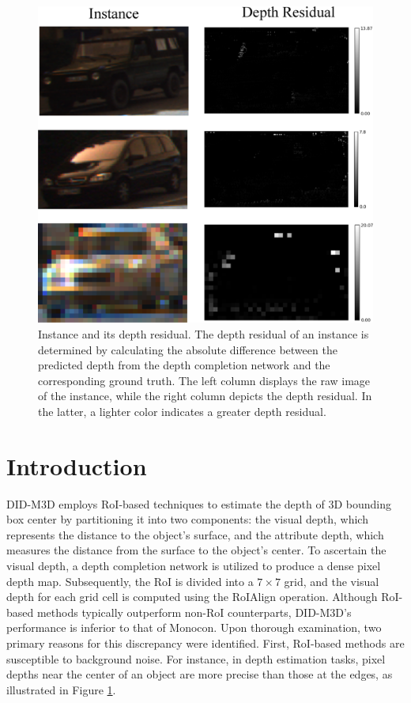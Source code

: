\documentclass{article}
\begin{document}
\begin{figure}[!t]
	\centering
	\includegraphics[width=1.0\linewidth]{Figures/depth_residual}
	\caption{Instance and its depth residual. The depth residual of an instance is determined by calculating the absolute difference between the predicted depth from the depth completion network and the corresponding ground truth. The left column displays the raw image of the instance, while the right column depicts the depth residual. In the latter, a lighter color indicates a greater depth residual.}
	\label{fig:depth_residual}
\end{figure}

\section{Introduction}
DID-M3D employs RoI-based techniques to estimate the depth of 3D bounding box center by partitioning it into two components: the visual depth, which represents the distance to the object's surface, and the attribute depth, which measures the distance from the surface to the object's center. To ascertain the visual depth, a depth completion network is utilized to produce a dense pixel depth map. Subsequently, the RoI is divided into a $7\times 7$ grid, and the visual depth for each grid cell is computed using the RoIAlign operation. Although RoI-based methods typically outperform non-RoI counterparts, DID-M3D's performance is inferior to that of Monocon. Upon thorough examination, two primary reasons for this discrepancy were identified. First, RoI-based methods are susceptible to background noise. For instance, in depth estimation tasks, pixel depths near the center of an object are more precise than those at the edges, as illustrated in Figure \ref{fig:depth_residual}. 
\end{document}
